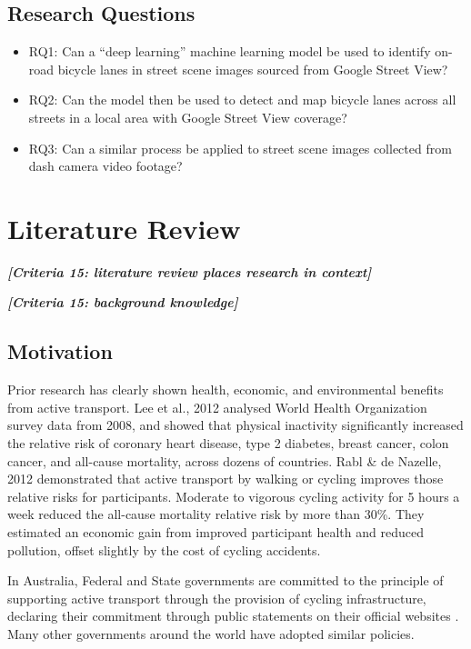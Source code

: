 \documentclass[11pt,twoside]{report}
\newcommand{\remark}[1]{{\bf \em [\marginpar{$\Leftarrow$}#1]}}
\begin{document}
\section{Research Questions}
\begin{itemize}
\item{RQ1: Can a ``deep learning'' machine learning model be used to identify on-road bicycle lanes in street scene images sourced from Google Street View?}
\item{RQ2: Can the model then be used to detect and map bicycle lanes across all streets in a local area with Google Street View coverage?}
\item{RQ3: Can a similar process be applied to street scene images collected from dash camera video footage?}
\end{itemize}


\chapter{Literature Review}

\remark{Criteria 15: literature review places research in context}

\remark{Criteria 15: background knowledge}

\section{Motivation}

Prior research has clearly shown health, economic, and environmental benefits from active transport.  Lee et al., 2012 \cite{LEE2012219} analysed World Health Organization survey data from 2008, and showed that physical inactivity significantly increased the relative risk of coronary heart disease, type 2 diabetes, breast cancer, colon cancer, and all-cause mortality, across dozens of countries.  Rabl \& de Nazelle, 2012 \cite{RABL2012121} demonstrated that active transport by walking or cycling improves those relative risks for participants.  Moderate to vigorous cycling activity for 5 hours a week reduced the all-cause mortality relative risk by more than 30\%.  They estimated an economic gain from improved participant health and reduced pollution, offset slightly by the cost of cycling accidents.

In Australia, Federal and State governments are committed to the principle of supporting active transport through the provision of cycling infrastructure, declaring their commitment through public statements on their official websites \cite{federal_policy_2019} \cite{state_policy_2020}.  Many other governments around the world have adopted similar policies.
\end{document}
